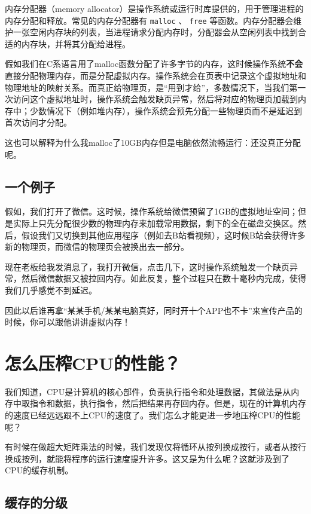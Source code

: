内存分配器（memory allocator）是操作系统或运行时库提供的，用于管理进程的内存分配和释放。常见的内存分配器有 \texttt{malloc} 、 \texttt{free} 等函数。内存分配器会维护一张空闲内存块的列表，当进程请求分配内存时，分配器会从空闲列表中找到合适的内存块，并将其分配给进程。

假如我们在C系语言用了malloc函数分配了许多字节的内存，这时候操作系统\textbf{不会}直接分配物理内存，而是分配虚拟内存。操作系统会在页表中记录这个虚拟地址和物理地址的映射关系。而真正给物理页，是“用到才给”，多数情况下，当我们第一次访问这个虚拟地址时，操作系统会触发缺页异常，然后将对应的物理页加载到内存中；少数情况下（例如堆内存），操作系统会预先分配一些物理页而不是延迟到首次访问才分配。

这也可以解释为什么我malloc了10GB内存但是电脑依然流畅运行：还没真正分配呢。

\subsection{一个例子}

假如，我们打开了微信。这时候，操作系统给微信预留了1GB的虚拟地址空间；但是实际上只先分配很少数的物理内存来加载常用数据，剩下的全在磁盘交换区。然后，假设我们又切换到其他应用程序（例如去B站看视频），这时候B站会获得许多新的物理页，而微信的物理页会被换出去一部分。

现在老板给我发消息了，我打开微信，点击几下，这时操作系统触发一个缺页异常，然后微信数据又被拉回内存。如此反复，整个过程只在数十毫秒内完成，使得我们几乎感觉不到延迟。

因此以后谁再拿“某某手机/某某电脑真好，同时开十个APP也不卡”来宣传产品的时候，你可以跟他讲讲虚拟内存！

\section{怎么压榨CPU的性能？}

我们知道，CPU是计算机的核心部件，负责执行指令和处理数据，其做法是从内存中取指令和数据，执行指令，然后把结果再存回内存。但是，现在的计算机内存的速度已经远远跟不上CPU的速度了。我们怎么才能更进一步地压榨CPU的性能呢？

有时候在做超大矩阵乘法的时候，我们发现仅将循环从按列换成按行，或者从按行换成按列，就能将程序的运行速度提升许多。这又是为什么呢？这就涉及到了CPU的缓存机制。

\subsection{缓存的分级}

